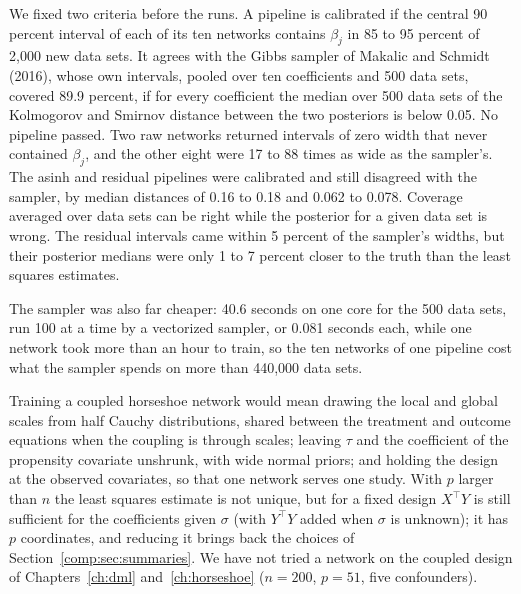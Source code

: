 We fixed two criteria before the runs. A pipeline is calibrated if the central 90 percent interval of each of its ten networks contains $\beta_j$ in 85 to 95 percent of 2,000 new data sets. It agrees with the Gibbs sampler of Makalic and Schmidt (2016), whose own intervals, pooled over ten coefficients and 500 data sets, covered 89.9 percent, if for every coefficient the median over 500 data sets of the Kolmogorov and Smirnov distance between the two posteriors is below 0.05. No pipeline passed. Two raw networks returned intervals of zero width that never contained $\beta_j$, and the other eight were 17 to 88 times as wide as the sampler's. The asinh and residual pipelines were calibrated and still disagreed with the sampler, by median distances of 0.16 to 0.18 and 0.062 to 0.078. Coverage averaged over data sets can be right while the posterior for a given data set is wrong. The residual intervals came within 5 percent of the sampler's widths, but their posterior medians were only 1 to 7 percent closer to the truth than the least squares estimates.

The sampler was also far cheaper: 40.6 seconds on one core for the 500 data sets, run 100 at a time by a vectorized sampler, or 0.081 seconds each, while one network took more than an hour to train, so the ten networks of one pipeline cost what the sampler spends on more than 440,000 data sets. 

Training a coupled horseshoe network would mean drawing the local and global scales from half Cauchy distributions, shared between the treatment and outcome equations when the coupling is through scales; leaving $\tau$ and the coefficient of the propensity covariate unshrunk, with wide normal priors; and holding the design at the observed covariates, so that one network serves one study. With $p$ larger than $n$ the least squares estimate is not unique, but for a fixed design $X^\top Y$ is still sufficient for the coefficients given $\sigma$ (with $Y^\top Y$ added when $\sigma$ is unknown); it has $p$ coordinates, and reducing it brings back the choices of Section~\ref{comp:sec:summaries}. We have not tried a network on the coupled design of Chapters~\ref{ch:dml} and~\ref{ch:horseshoe} ($n = 200$, $p = 51$, five confounders).
